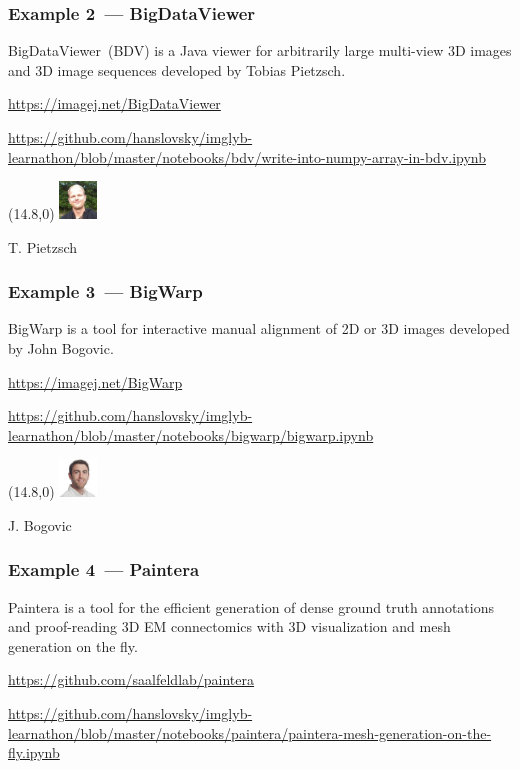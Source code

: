 \documentclass[%
]{beamer}
\newcommand{\urlScrSz}[1]{\scriptsize\url{#1}}
\begin{document}
\begin{frame}
    \frametitle{Example 2~--- BigDataViewer}
    BigDataViewer~(BDV) is a Java viewer for arbitrarily large multi-view 3D images and 3D image
    sequences developed by Tobias Pietzsch.
    
    \urlScrSz{https://imagej.net/BigDataViewer}
    
    \urlScrSz{https://github.com/hanslovsky/imglyb-learnathon/blob/master/notebooks/bdv/write-into-numpy-array-in-bdv.ipynb}

    \begin{textblock}{3}(14.8,0)
        \tiny\includegraphics[width=1cm]{fig/people/pietzsch.jpg}

        T. Pietzsch
    \end{textblock}
\end{frame}

\begin{frame}
    \frametitle{Example 3~--- BigWarp}
    BigWarp is a tool for interactive manual alignment of 2D or 3D images developed by John Bogovic.

    \urlScrSz{https://imagej.net/BigWarp}

    \urlScrSz{https://github.com/hanslovsky/imglyb-learnathon/blob/master/notebooks/bigwarp/bigwarp.ipynb}

        \begin{textblock}{3}(14.8,0)
        \tiny\includegraphics[width=1cm]{fig/people/bogovic.jpg}

        J. Bogovic
    \end{textblock}
\end{frame}

\begin{frame}
    \frametitle{Example 4~--- Paintera}
    Paintera is a tool for the efficient generation of dense ground truth annotations and proof-reading
    3D EM connectomics with 3D visualization and mesh generation on the fly.

    \urlScrSz{https://github.com/saalfeldlab/paintera}

    \urlScrSz{https://github.com/hanslovsky/imglyb-learnathon/blob/master/notebooks/paintera/paintera-mesh-generation-on-the-fly.ipynb}
\end{frame}
\end{document}
